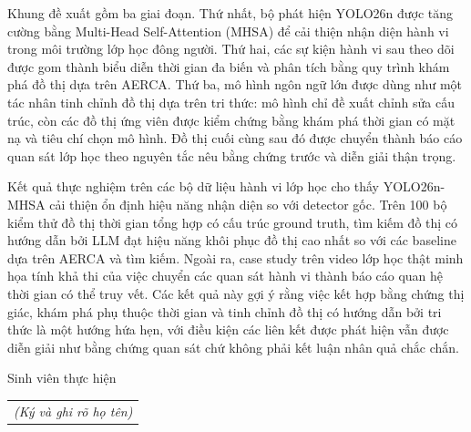 \documentclass[a4paper,13pt,3p,twoside]{report}
\numberwithin{equation}{chapter}
\theoremstyle{definition}
\begin{document}
Khung đề xuất gồm ba giai đoạn. Thứ nhất, bộ phát hiện YOLO26n được tăng cường bằng Multi-Head Self-Attention (MHSA) để cải thiện nhận diện hành vi trong môi trường lớp học đông người. Thứ hai, các sự kiện hành vi sau theo dõi được gom thành biểu diễn thời gian đa biến và phân tích bằng quy trình khám phá đồ thị dựa trên AERCA. Thứ ba, mô hình ngôn ngữ lớn được dùng như một tác nhân tinh chỉnh đồ thị dựa trên tri thức: mô hình chỉ đề xuất chỉnh sửa cấu trúc, còn các đồ thị ứng viên được kiểm chứng bằng khám phá thời gian có mặt nạ và tiêu chí chọn mô hình. Đồ thị cuối cùng sau đó được chuyển thành báo cáo quan sát lớp học theo nguyên tắc nêu bằng chứng trước và diễn giải thận trọng.

Kết quả thực nghiệm trên các bộ dữ liệu hành vi lớp học cho thấy YOLO26n-MHSA cải thiện ổn định hiệu năng nhận diện so với detector gốc. Trên 100 bộ kiểm thử đồ thị thời gian tổng hợp có cấu trúc ground truth, tìm kiếm đồ thị có hướng dẫn bởi LLM đạt hiệu năng khôi phục đồ thị cao nhất so với các baseline dựa trên AERCA và tìm kiếm. Ngoài ra, case study trên video lớp học thật minh họa tính khả thi của việc chuyển các quan sát hành vi thành báo cáo quan hệ thời gian có thể truy vết. Các kết quả này gợi ý rằng việc kết hợp bằng chứng thị giác, khám phá phụ thuộc thời gian và tinh chỉnh đồ thị có hướng dẫn bởi tri thức là một hướng hứa hẹn, với điều kiện các liên kết được phát hiện vẫn được diễn giải như bằng chứng quan sát chứ không phải kết luận nhân quả chắc chắn.

\begin{flushright}
Sinh viên thực hiện\\
\begin{tabular}{@{}c@{}}
\textit{(Ký và ghi rõ họ tên)}
\end{tabular}
\end{flushright}
\end{document}
